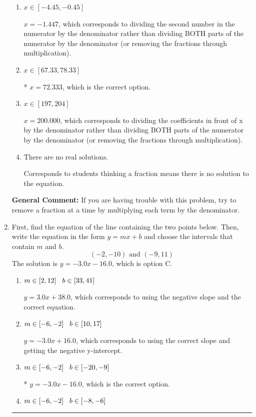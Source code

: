 \documentclass{extbook}[14pt]
\newcommand{\litem}[1]{\item #1

\rule{\textwidth}{0.4pt}}
\begin{document}
\begin{enumerate}
{\begin{enumerate}[label=\Alph*.]
 $x = 44.333$, which corresponds to not distributing the negative in front of the second fraction.
\item \( x \in [-4.45, -0.45] \)

 $x = -1.447$, which corresponds to dividing the second number in the numerator by the denominator rather than dividing BOTH parts of the numerator by the denominator (or removing the fractions through multiplication).
\item \( x \in [67.33, 78.33] \)

* $x = 72.333$, which is the correct option.
\item \( x \in [197, 204] \)

 $x = 200.000$, which corresponds to dividing the coefficients in front of x by the denominator rather than dividing BOTH parts of the numerator by the denominator (or removing the fractions through multiplication).
\item \( \text{There are no real solutions.} \)

Corresponds to students thinking a fraction means there is no solution to the equation.
\end{enumerate}

\textbf{General Comment:} If you are having trouble with this problem, try to remove a fraction at a time by multiplying each term by the denominator.
}
\litem{
First, find the equation of the line containing the two points below. Then, write the equation in the form $ y=mx+b $ and choose the intervals that contain $m$ and $b$.
\[ (-2, -10) \text{ and } (-9, 11) \]The solution is \( y = -3.0x -16.0 \), which is option C.\begin{enumerate}[label=\Alph*.]
\item \( m \in [2, 12] \hspace*{3mm} b \in [33, 41] \)

 $y = 3.0x + 38.0$, which corresponds to using the negative slope and the correct equation.
\item \( m \in [-6, -2] \hspace*{3mm} b \in [10, 17] \)

 $y = -3.0x + 16.0$, which corresponds to using the correct slope and getting the negative y-intercept.
\item \( m \in [-6, -2] \hspace*{3mm} b \in [-20, -9] \)

* $y = -3.0x -16.0$, which is the correct option.
\item \( m \in [-6, -2] \hspace*{3mm} b \in [-8, -6] \)


\end{enumerate}}
\end{enumerate}
\end{document}
